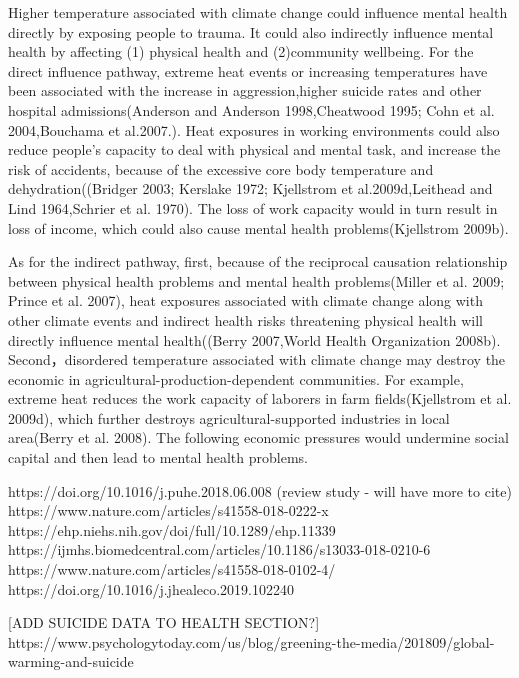\documentclass{article}
\begin{document}
Higher temperature associated with climate change could influence mental health directly by exposing people to trauma. It could also indirectly influence mental health by affecting (1) physical health and (2)community wellbeing\citep{RN1314}. For the direct influence pathway, extreme heat events or increasing temperatures have been associated with the increase in aggression,higher suicide rates and other hospital admissions(Anderson and Anderson 1998,Cheatwood 1995; Cohn et al. 2004,Bouchama et al.2007.). Heat exposures in working environments could also reduce people's capacity to deal with physical and mental task, and increase the risk of accidents, because of the excessive core body temperature and dehydration((Bridger 2003; Kerslake 1972; Kjellstrom et al.2009d,Leithead and Lind 1964,Schrier et al. 1970). The loss of work capacity would in turn result in loss of income, which could also cause mental health problems(Kjellstrom 2009b).%

As for the indirect pathway, first, because of the reciprocal causation relationship between physical health problems and mental health problems(Miller et al. 2009; Prince et al. 2007), heat exposures associated with climate change along with other climate events and indirect health risks threatening physical health will directly influence mental health((Berry 2007,World Health Organization 2008b). Second，disordered temperature associated with climate change may destroy the economic in agricultural-production-dependent communities. For example, extreme heat reduces the work capacity of laborers in farm fields(Kjellstrom et al. 2009d), which further destroys agricultural-supported industries in local area(Berry et al. 2008). The following economic pressures would undermine social capital and then lead to mental health problems.




https://doi.org/10.1016/j.puhe.2018.06.008 (review study - will have more to cite)
https://www.nature.com/articles/s41558-018-0222-x
https://ehp.niehs.nih.gov/doi/full/10.1289/ehp.11339
https://ijmhs.biomedcentral.com/articles/10.1186/s13033-018-0210-6
https://www.nature.com/articles/s41558-018-0102-4/
https://doi.org/10.1016/j.jhealeco.2019.102240

[ADD SUICIDE DATA TO HEALTH SECTION?]
https://www.psychologytoday.com/us/blog/greening-the-media/201809/global-warming-and-suicide
\end{document}

